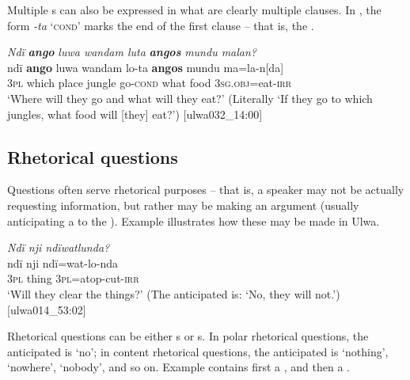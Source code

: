   Multiple s can also be expressed in what are clearly multiple clauses. In , the  form \textit{-ta} ‘\textsc{cond}’ marks the end of the first clause – that is, the .


\ea%
    \label{ex:syntax:64}
          \textit{Ndï} \textbf{\textit{ango}} \textit{luwa wandam luta} \textbf{\textit{angos}} \textit{mundu malan?}\\
\gll    ndï  \textbf{ango}  luwa  wandam  lo-ta    \textbf{angos}  mundu     ma=la-n[da]\\
    3\textsc{pl}  which  place  jungle    go-\textsc{cond}  what  food    3\textsc{sg.obj}=eat-\textsc{irr}\\
\glt `Where will they go and what will they eat?’ (Literally ‘If they go to which jungles, what food will [they] eat?’) [ulwa032\_14:00]
\z

\subsection{Rhetorical questions}\label{sec:13.1.4}


Questions often serve rhetorical purposes – that is, a speaker may not be actually requesting information, but rather may be making an argument (usually anticipating a  to the ). Example  illustrates how these may be made in Ulwa.

\ea%
    \label{ex:syntax:65}
          \textit{Ndï nji ndïwatlunda?}\\
\gll ndï  nji    ndï=wat-lo-nda\\
    3\textsc{pl}  thing  3\textsc{pl=}atop-cut-\textsc{irr}\\
\glt `Will they clear the things?’ (The anticipated  is: ‘No, they will not.’) [ulwa014\_53:02]
\z

Rhetorical questions can be either s or s. In polar rhetorical questions, the anticipated  is ‘no’; in content rhetorical questions, the anticipated  is ‘nothing’, ‘nowhere’, ‘nobody’, and so on. Example  contains first a , and then a .

